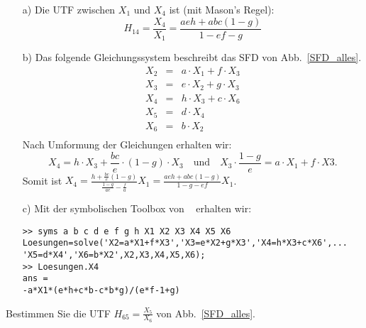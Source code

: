 \begin{enumerate}
\item[a)] Die UTF zwischen $X_1$ und $X_4$ ist (mit Mason's Regel):\\
\begin{equation*}
H_{14}=\frac{X_4}{X_1}=\frac{aeh+abc(1-g)}{1-ef-g}
\end{equation*}
\item[b)] Das folgende Gleichungssystem beschreibt das SFD von Abb.~\ref{SFD_alles}.
\begin{eqnarray*}
X_2 &=&a\cdot X_1+f\cdot X_3\\
X_3 &=&e\cdot X_2+g\cdot X_3\\
X_4 &=&h\cdot X_3+c\cdot X_6\\
X_5 &=&d\cdot X_4\\
X_6 &=&b\cdot X_2\\
\end{eqnarray*}
Nach Umformung der Gleichungen erhalten wir:
\begin{equation*}
X_4=h\cdot X_3+\frac{bc}{e}\cdot (1-g)\cdot X_3\quad\text{und}\quad X_3\cdot \frac{1-g}{e}=a\cdot X_1+f\cdot X3.
\end{equation*}
Somit ist $X_4=\frac{h+\frac{bc}{e}(1-g)}{\frac{1-g}{ae}-\frac{f}{a}}X_1=\frac{aeh+abc(1-g)}{1-g-ef}X_1$.
\item[c)] Mit der symbolischen Toolbox von \matlogo~ erhalten wir:
\begin{verbatim}
>> syms a b c d e f g h X1 X2 X3 X4 X5 X6
Loesungen=solve('X2=a*X1+f*X3','X3=e*X2+g*X3','X4=h*X3+c*X6',...
'X5=d*X4','X6=b*X2',X2,X3,X4,X5,X6);
>> Loesungen.X4
ans = 
-a*X1*(e*h+c*b-c*b*g)/(e*f-1+g)
\end{verbatim}
\end{enumerate}

\aufg
Bestimmen Sie die UTF $H_{65}=\frac{X_5}{X_6}$ von Abb.~\ref{SFD_alles}.

